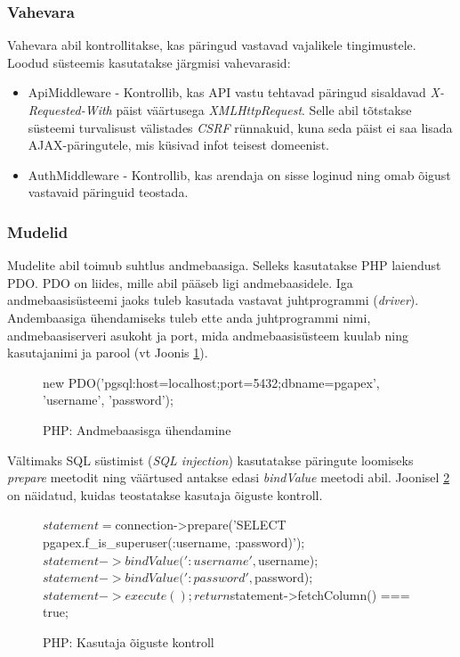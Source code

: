 \documentclass[a4paper,12pt]{article} %
\begin{document}
\subsubsection{Vahevara}
Vahevara abil kontrollitakse, kas päringud vastavad vajalikele tingimustele. Loodud süsteemis kasutatakse järgmisi vahevarasid:
\begin{itemize}
\item ApiMiddleware - Kontrollib, kas API vastu tehtavad päringud sisaldavad \textit{X-Requested-With} päist väärtusega \textit{XMLHttpRequest}. Selle abil tõtstakse süsteemi turvalisust välistades \textit{CSRF} rünnakuid, kuna seda päist ei saa lisada AJAX-päringutele, mis küsivad infot teisest domeenist.
\item AuthMiddleware - Kontrollib, kas arendaja on sisse loginud ning omab õigust vastavaid päringuid teostada.
\end{itemize}

\subsubsection{Mudelid}
Mudelite abil toimub suhtlus andmebaasiga. Selleks kasutatakse PHP laiendust PDO. PDO on liides, mille abil pääseb ligi andmebaasidele. Iga andmebaasisüsteemi jaoks tuleb kasutada vastavat juhtprogrammi (\textit{driver}). Andembaasiga ühendamiseks tuleb ette anda juhtprogrammi nimi, andmebaasiserveri asukoht ja port, mida andmebaasisüsteem kuulab ning kasutajanimi ja parool (vt Joonis \ref{fig_andmebaasiga_ühendamine}). \cite{PDO}
\begin{figure}[H]
\centering
\begin{PHP}
new PDO('pgsql:host=localhost;port=5432;dbname=pgapex', 'username', 'password');
\end{PHP}
\caption{PHP: Andmebaasisga ühendamine}
\label{fig_andmebaasiga_ühendamine}
\end{figure}
Vältimaks SQL süstimist (\textit{SQL injection}) kasutatakse päringute loomiseks \textit{prepare} meetodit ning väärtused antakse edasi \textit{bindValue} meetodi abil. Joonisel \ref{fig_php_kasutaja_õiguste_kontroll} on näidatud, kuidas teostatakse kasutaja õiguste kontroll.
 \begin{figure}[H]
\centering
\begin{PHP}
$statement = $connection->prepare('SELECT pgapex.f_is_superuser(:username, :password)');
$statement->bindValue(':username', $username);
$statement->bindValue(':password', $password);
$statement->execute();
return $statement->fetchColumn() === true;
\end{PHP}
\caption{PHP: Kasutaja õiguste kontroll}
\label{fig_php_kasutaja_õiguste_kontroll}
\end{figure}
\end{document}
